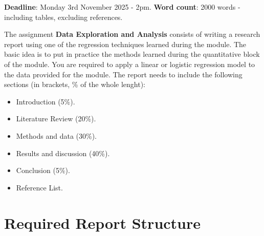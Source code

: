 \documentclass[
  letterpaper,
  DIV=11,
  numbers=noendperiod]{scrreprt}
\providecommand{\tightlist}{%
  \setlength{\itemsep}{0pt}\setlength{\parskip}{0pt}}\usepackage{longtable,booktabs,array}
\begin{document}
\textbf{Deadline}: Monday 3rd November 2025 - 2pm. \textbf{Word count}:
2000 words - including tables, excluding references.

The assignment \textbf{Data Exploration and Analysis} consists of
writing a research report using one of the regression techniques learned
during the module. The basic idea is to put in practice the methods
learned during the quantitative block of the module. You are required to
apply a linear or logistic regression model to the data provided for the
module. The report needs to include the following sections (in brackets,
\% of the whole lenght):

\begin{itemize}
\tightlist
\item
  Introduction (5\%).
\item
  Literature Review (20\%).
\item
  Methods and data (30\%).
\item
  Results and discussion (40\%).
\item
  Conclusion (5\%).
\item
  Reference List.
\end{itemize}

\section*{Required Report Structure}\label{required-report-structure}

\end{document}
